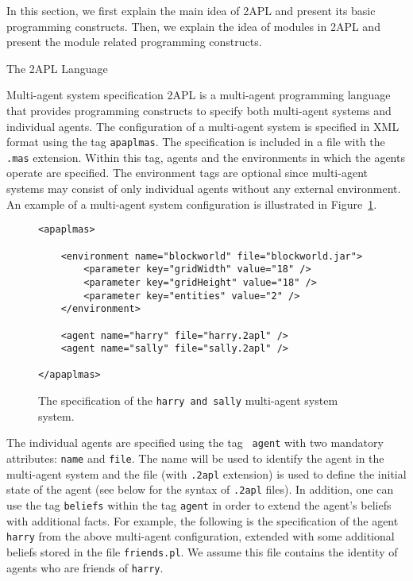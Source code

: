 \renewcommand{\rule}[1]{$\langle #1\rangle$}

In this section, we first explain the main idea of 2APL and present
its basic programming constructs. Then, we explain the idea of
modules in 2APL and present the module related programming
constructs.

\begin{chapter}{The 2APL Language}\label{chap:language}

    \begin{section}{Multi-agent system specification}
        2APL is a multi-agent programming language that provides programming
        constructs to specify both multi-agent systems and individual
        agents. The configuration of a multi-agent system is specified in XML
        format using the tag {\tt apaplmas}. The specification is
        included in a file with the {\tt .mas} extension.
        Within this tag, agents and the environments in which the agents operate are
        specified. The environment tags are optional since multi-agent systems
        may consist of only individual agents without any external
        environment. An example of a multi-agent system
        configuration is illustrated in Figure~\ref{fig:masfile}.

\begin{figure}[ht]
\begin{verbatim}
<apaplmas>

    <environment name="blockworld" file="blockworld.jar">
        <parameter key="gridWidth" value="18" />
        <parameter key="gridHeight" value="18" />
        <parameter key="entities" value="2" />
    </environment>

    <agent name="harry" file="harry.2apl" />
    <agent name="sally" file="sally.2apl" />

</apaplmas>
\end{verbatim}
\caption{The specification of the {\tt harry and sally} multi-agent
system system.}\label{fig:masfile}
\end{figure}

        The individual agents are specified using the tag {\tt
        agent} with two mandatory attributes: {\tt name} and
        {\tt file}. The name will be used to identify the agent in the multi-agent system and the
        file (with {\tt .2apl} extension) is used to define the
        initial state of the agent (see below for the syntax of {\tt .2apl} files).
        In addition, one can use the tag {\tt beliefs} within the
        tag {\tt agent} in order to extend the agent's beliefs with additional facts.
        For example, the following is the specification of the agent {\tt harry} from the
        above multi-agent configuration, extended with some additional
        beliefs stored in the file {\tt friends.pl}. We assume this
        file contains the identity of agents who are friends of {\tt harry}.


\end{section}
\end{chapter}

